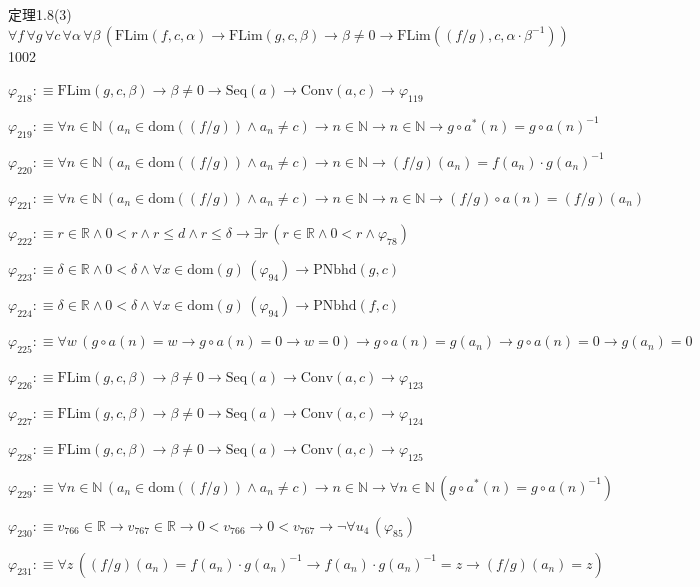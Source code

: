 \begin{fullproof}{定理1.8(3)}{$\forall f\,\forall g\,\forall c\,\forall \alpha\,\forall \beta\,(\mathrm{FLim}(f,c,\alpha) \to \mathrm{FLim}(g,c,\beta) \to \beta \neq 0 \to \mathrm{FLim}((f / g),c,\alpha \cdot \beta^{-1}))$}{1002}
\begin{abbrevlist}
\item $\varphi_{218} :\equiv \mathrm{FLim}(g,c,\beta) \to \beta \neq 0 \to \mathrm{Seq}(a) \to \mathrm{Conv}(a,c) \to \varphi_{119}$
\item $\varphi_{219} :\equiv \forall n \in \mathbb{N}\,(a_{n} \in \mathrm{dom}((f / g)) \land a_{n} \neq c) \to n \in \mathbb{N} \to n \in \mathbb{N} \to g \circ a^{\ast}(n) = g \circ a(n)^{-1}$
\item $\varphi_{220} :\equiv \forall n \in \mathbb{N}\,(a_{n} \in \mathrm{dom}((f / g)) \land a_{n} \neq c) \to n \in \mathbb{N} \to (f / g)(a_{n}) = f(a_{n}) \cdot g(a_{n})^{-1}$
\item $\varphi_{221} :\equiv \forall n \in \mathbb{N}\,(a_{n} \in \mathrm{dom}((f / g)) \land a_{n} \neq c) \to n \in \mathbb{N} \to n \in \mathbb{N} \to (f / g) \circ a(n) = (f / g)(a_{n})$
\item $\varphi_{222} :\equiv r \in \mathbb{R} \land 0 < r \land r \leq d \land r \leq \delta \to \exists r\,(r \in \mathbb{R} \land 0 < r \land \varphi_{78})$
\item $\varphi_{223} :\equiv \delta \in \mathbb{R} \land 0 < \delta \land \forall x \in \mathrm{dom}(g)\,(\varphi_{94}) \to \mathrm{PNbhd}(g,c)$
\item $\varphi_{224} :\equiv \delta \in \mathbb{R} \land 0 < \delta \land \forall x \in \mathrm{dom}(g)\,(\varphi_{94}) \to \mathrm{PNbhd}(f,c)$
\item $\varphi_{225} :\equiv \forall w\,(g \circ a(n) = w \to g \circ a(n) = 0 \to w = 0) \to g \circ a(n) = g(a_{n}) \to g \circ a(n) = 0 \to g(a_{n}) = 0$
\item $\varphi_{226} :\equiv \mathrm{FLim}(g,c,\beta) \to \beta \neq 0 \to \mathrm{Seq}(a) \to \mathrm{Conv}(a,c) \to \varphi_{123}$
\item $\varphi_{227} :\equiv \mathrm{FLim}(g,c,\beta) \to \beta \neq 0 \to \mathrm{Seq}(a) \to \mathrm{Conv}(a,c) \to \varphi_{124}$
\item $\varphi_{228} :\equiv \mathrm{FLim}(g,c,\beta) \to \beta \neq 0 \to \mathrm{Seq}(a) \to \mathrm{Conv}(a,c) \to \varphi_{125}$
\item $\varphi_{229} :\equiv \forall n \in \mathbb{N}\,(a_{n} \in \mathrm{dom}((f / g)) \land a_{n} \neq c) \to n \in \mathbb{N} \to \forall n \in \mathbb{N}\,(g \circ a^{\ast}(n) = g \circ a(n)^{-1})$
\item $\varphi_{230} :\equiv v_{766} \in \mathbb{R} \to v_{767} \in \mathbb{R} \to 0 < v_{766} \to 0 < v_{767} \to \neg \forall u_{4}\,(\varphi_{85})$
\item $\varphi_{231} :\equiv \forall z\,((f / g)(a_{n}) = f(a_{n}) \cdot g(a_{n})^{-1} \to f(a_{n}) \cdot g(a_{n})^{-1} = z \to (f / g)(a_{n}) = z)$

\end{abbrevlist}
\end{fullproof}
